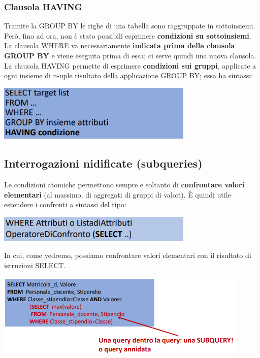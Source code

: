 \documentclass[12pt]{article}
\begin{document}
\subsubsection{Clausola HAVING}
Tramite la GROUP BY le righe di una tabella sono raggruppate in sottoinsiemi.
Però, fino ad ora, non è stato possibili esprimere \textbf{condizioni su sottoinsiemi}.
La clausola WHERE va necessariamente \textbf{indicata prima della clausola GROUP BY} e viene eseguita prima di essa; ci serve quindi una nuova clausola.
La clausola HAVING permette di esprimere \textbf{condizioni sui gruppi}, applicate a ogni insieme di n-uple risultato della applicazione GROUP BY; essa ha sintassi:
\begin{center}
    \includegraphics[width = 0.70\textwidth]{Images/218.PNG}
\end{center}
\subsection{Interrogazioni nidificate (subqueries)}
Le condizioni atomiche permettono sempre e soltanto di \textbf{confrontare valori elementari} (al massimo, di aggregati di gruppi di valori).
È quindi utile estendere i confronti a sintassi del tipo:
\begin{center}
    \includegraphics[width = 0.70\textwidth]{Images/219.PNG}
\end{center}
In cui, come vedremo, possiamo confrontare valori elementari con il risultato di istruzioni SELECT.
\begin{center}
    \includegraphics[width = 0.90\textwidth]{Images/220.PNG}
\end{center}
\end{document}
